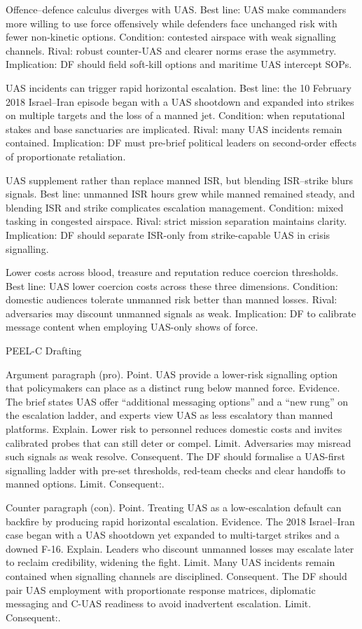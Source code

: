 Offence–defence calculus diverges with UAS. Best line: UAS make commanders more willing to use force offensively while defenders face unchanged risk with fewer non-kinetic options. Condition: contested airspace with weak signalling channels. Rival: robust counter-UAS and clearer norms erase the asymmetry. Implication: DF should field soft-kill options and maritime UAS intercept SOPs.

UAS incidents can trigger rapid horizontal escalation. Best line: the 10 February 2018 Israel–Iran episode began with a UAS shootdown and expanded into strikes on multiple targets and the loss of a manned jet. Condition: when reputational stakes and base sanctuaries are implicated. Rival: many UAS incidents remain contained. Implication: DF must pre-brief political leaders on second-order effects of proportionate retaliation.

UAS supplement rather than replace manned ISR, but blending ISR–strike blurs signals. Best line: unmanned ISR hours grew while manned remained steady, and blending ISR and strike complicates escalation management. Condition: mixed tasking in congested airspace. Rival: strict mission separation maintains clarity. Implication: DF should separate ISR-only from strike-capable UAS in crisis signalling.

Lower costs across blood, treasure and reputation reduce coercion thresholds. Best line: UAS lower coercion costs across these three dimensions. Condition: domestic audiences tolerate unmanned risk better than manned losses. Rival: adversaries may discount unmanned signals as weak. Implication: DF to calibrate message content when employing UAS-only shows of force.

PEEL-C Drafting

Argument paragraph (pro).
Point. UAS provide a lower-risk signalling option that policymakers can place as a distinct rung below manned force.
Evidence. The brief states UAS offer “additional messaging options” and a “new rung” on the escalation ladder, and experts view UAS as less escalatory than manned platforms.
Explain. Lower risk to personnel reduces domestic costs and invites calibrated probes that can still deter or compel.
Limit. Adversaries may misread such signals as weak resolve.
Consequent. The DF should formalise a UAS-first signalling ladder with pre-set thresholds, red-team checks and clear handoffs to manned options. Limit. Consequent:.

Counter paragraph (con).
Point. Treating UAS as a low-escalation default can backfire by producing rapid horizontal escalation.
Evidence. The 2018 Israel–Iran case began with a UAS shootdown yet expanded to multi-target strikes and a downed F-16.
Explain. Leaders who discount unmanned losses may escalate later to reclaim credibility, widening the fight.
Limit. Many UAS incidents remain contained when signalling channels are disciplined.
Consequent. The DF should pair UAS employment with proportionate response matrices, diplomatic messaging and C-UAS readiness to avoid inadvertent escalation. Limit. Consequent:.

